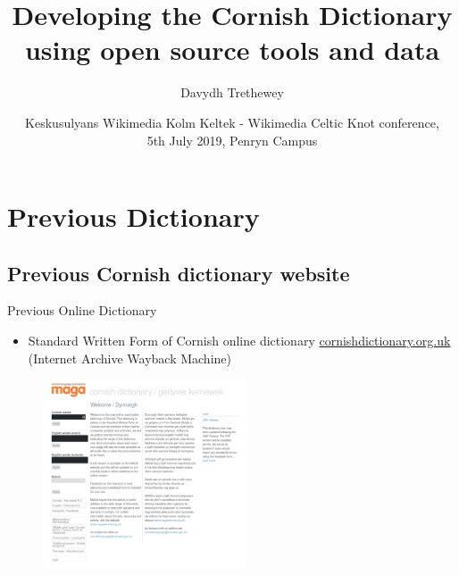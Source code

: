 \documentclass[handout]{beamer}
\title %
[Developing the Cornish Dictionary]
{Developing the Cornish Dictionary using open source tools and data}
\author %
{Davydh Trethewey}%
\institute %
{Project Support Assistant, Sodhva Kernewek - Cornish Language Office \\ 
Konsel Kernow - Cornwall Council \\
davidtreth@gmail.com \\ \href{http://taklowkernewek.neocities.org}{taklowkernewek.neocities.org}}
\date[WikiCelticKnot2019] %
{Keskusulyans Wikimedia Kolm Keltek - Wikimedia Celtic Knot conference,\\ 5th July 2019, Penryn Campus}
\begin{document}
\begin{frame}
  \titlepage
{}  
\end{frame}
\section{Previous Dictionary}
\subsection{Previous Cornish dictionary website}
\begin{frame}{Previous Online Dictionary}
  \begin{itemize}  
  \item Standard Written Form of Cornish online dictionary \href{https://web.archive.org/web/20190324085922/http://www.cornishdictionary.org.uk/cornish/alpha}{cornishdictionary.org.uk} (Internet Archive Wayback Machine)
  \end{itemize}
  \begin{figure}
 \begin{center}
\includegraphics[width=6cm]{cornishdictionarywebsite.png}
 \end{center}
 \caption{}
 \label{fig:SWFdict_screenshot}
\end{figure}
\end{frame}
\end{document}

